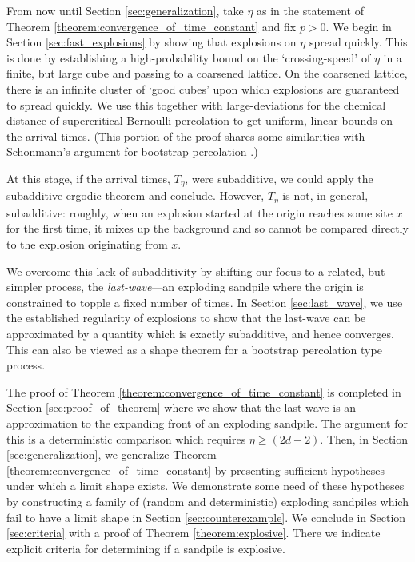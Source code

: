 \documentclass[12pt]{amsart}
\begin{document}
From now until Section \ref{sec:generalization}, take $\eta$ as in the statement of Theorem \ref{theorem:convergence_of_time_constant} and fix $p > 0$. We begin in Section \ref{sec:fast_explosions} by showing that explosions on $\eta$ spread quickly. This is done by establishing a high-probability bound on the `crossing-speed' of $\eta$ in a finite, but large cube and passing to a coarsened lattice. On the coarsened lattice, there is an infinite cluster of `good cubes' upon which explosions are guaranteed to spread quickly. We use this together with
large-deviations for the chemical distance of supercritical Bernoulli percolation to get
uniform, linear bounds on the arrival times. (This portion of the proof shares some similarities with 
Schonmann's argument for bootstrap percolation \cite{schonmann1992behavior}.)

At this stage, if the arrival times, $T_{\eta}$, were subadditive, we could apply the subadditive ergodic theorem
and conclude. However, $T_{\eta}$ is not, in general, subadditive: roughly, when an explosion
started at the origin reaches some site $x$ for the first time, it mixes up the background
and so cannot be compared directly to the explosion originating from $x$. 

We overcome this lack of subadditivity by shifting our focus to a related, but simpler process, 
the {\it last-wave}---an exploding sandpile where the origin is constrained to topple a fixed number of times.  In Section \ref{sec:last_wave}, we use the established regularity of explosions to show that the last-wave can be approximated by a quantity which is exactly subadditive, and hence converges. This can also be viewed as a shape theorem for a bootstrap percolation type process. 

The proof of Theorem \ref{theorem:convergence_of_time_constant} is completed in Section \ref{sec:proof_of_theorem} where we show that the last-wave is an approximation to the expanding front of an exploding sandpile. The argument for this is a deterministic comparison which requires $\eta \geq (2d - 2)$. Then, in Section \ref{sec:generalization}, we generalize Theorem \ref{theorem:convergence_of_time_constant} 
by presenting sufficient hypotheses under which a limit shape exists. We demonstrate some need of these hypotheses
by constructing a family of (random and deterministic) exploding sandpiles which fail to have a limit shape in Section \ref{sec:counterexample}. We conclude in Section \ref{sec:criteria} with a proof of Theorem \ref{theorem:explosive}. There we indicate explicit criteria 
for determining if a sandpile is explosive. 
\end{document}
